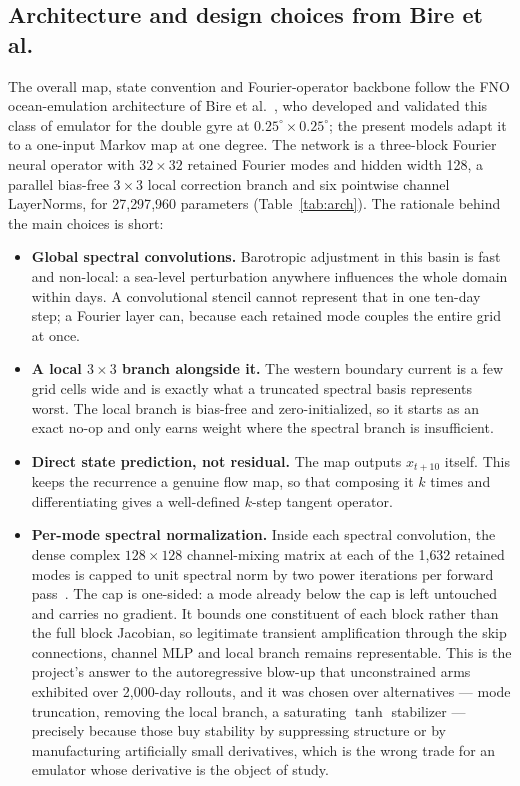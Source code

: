 \documentclass[3p,12pt]{elsarticle}
\newcommand{\FNO}{FNO}
\begin{document}
\subsection{Architecture and design choices from Bire et al.}
\label{sec:architecture}

The overall map, state convention and Fourier-operator backbone follow the
\FNO{} ocean-emulation architecture of Bire et al.~\cite{Bire2025}, who developed
and validated this class of emulator for the double gyre at
$0.25^\circ\times0.25^\circ$; the present models adapt it to a one-input Markov
map at one degree. The network is a three-block Fourier neural operator with
$32\times32$ retained Fourier modes and hidden width 128, a parallel bias-free
$3\times3$ local correction branch and six pointwise channel LayerNorms, for
27{,}297{,}960 parameters (Table~\ref{tab:arch}). The rationale behind the main
choices is short:

\begin{itemize}
\item \textbf{Global spectral convolutions.} Barotropic adjustment in this basin
is fast and non-local: a sea-level perturbation anywhere influences the whole
domain within days. A convolutional stencil cannot represent that in one
ten-day step; a Fourier layer can, because each retained mode couples the entire
grid at once.
\item \textbf{A local $3\times3$ branch alongside it.} The western boundary
current is a few grid cells wide and is exactly what a truncated spectral basis
represents worst. The local branch is bias-free and zero-initialized, so it
starts as an exact no-op and only earns weight where the spectral branch is
insufficient.
\item \textbf{Direct state prediction, not residual.} The map outputs
$x_{t+10}$ itself. This keeps the recurrence a genuine flow map, so that
composing it $k$ times and differentiating gives a well-defined $k$-step
tangent operator.
\item \textbf{Per-mode spectral normalization.} Inside each spectral
convolution, the dense complex $128\times128$ channel-mixing matrix at each of
the 1{,}632 retained modes is capped to unit spectral norm by two power
iterations per forward pass~\cite{McCabe2023}. The cap is one-sided: a mode
already below the cap is left untouched and carries no gradient. It bounds one
constituent of each block rather than the full block Jacobian, so legitimate
transient amplification through the skip connections, channel MLP and local
branch remains representable. This is the project's answer to the autoregressive
blow-up that unconstrained arms exhibited over 2{,}000-day rollouts, and it was
chosen over alternatives --- mode truncation, removing the local branch, a
saturating $\tanh$ stabilizer --- precisely because those buy stability by
suppressing structure or by manufacturing artificially small derivatives, which
is the wrong trade for an emulator whose derivative is the object of study.
\end{itemize}
\end{document}

